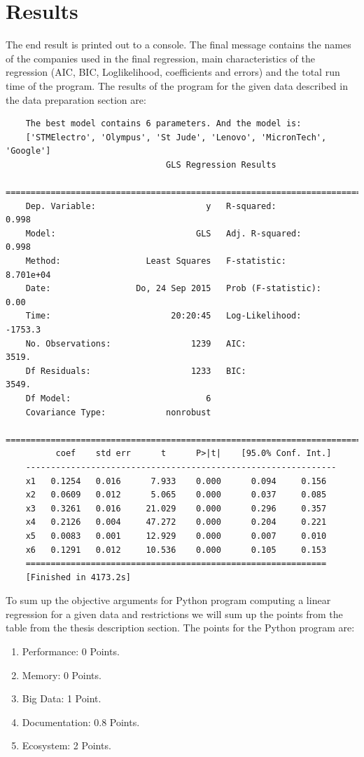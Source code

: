 \documentclass[
  twoside,
  11pt, a4paper,
  footinclude=true,
  headinclude=true,
  cleardoublepage=empty
]{scrreprt}
\begin{document}
    \section{Results}
    The end result is printed out to a console. The final message contains the names of the companies used in the final regression, main characteristics of the regression (AIC, BIC, Loglikelihood, coefficients and errors) and the total run time of the program. 
    The results of the program for the given data described in the data preparation section are:
    \begin{verbatim}
    The best model contains 6 parameters. And the model is:
    ['STMElectro', 'Olympus', 'St Jude', 'Lenovo', 'MicronTech', 'Google']
                                GLS Regression Results                            
    ==========================================================================
    Dep. Variable:                      y   R-squared:               0.998
    Model:                            GLS   Adj. R-squared:          0.998
    Method:                 Least Squares   F-statistic:             8.701e+04
    Date:                 Do, 24 Sep 2015   Prob (F-statistic):      0.00
    Time:                        20:20:45   Log-Likelihood:          -1753.3
    No. Observations:                1239   AIC:                     3519.
    Df Residuals:                    1233   BIC:                     3549.
    Df Model:                           6                                         
    Covariance Type:            nonrobust                                         
    ==========================================================================
          coef    std err      t      P>|t|    [95.0% Conf. Int.]
    --------------------------------------------------------------
    x1   0.1254   0.016      7.933    0.000      0.094     0.156
    x2   0.0609   0.012      5.065    0.000      0.037     0.085
    x3   0.3261   0.016     21.029    0.000      0.296     0.357
    x4   0.2126   0.004     47.272    0.000      0.204     0.221
    x5   0.0083   0.001     12.929    0.000      0.007     0.010
    x6   0.1291   0.012     10.536    0.000      0.105     0.153
    ============================================================
    [Finished in 4173.2s]
    \end{verbatim}
    To sum up the objective arguments for Python program computing a linear regression for a given data and restrictions we will sum up the points from the table from the thesis description section.
    The points for the Python program are:
    \begin{enumerate}
        \item Performance: 0 Points.
        \item Memory: 0 Points.
        \item Big Data: 1 Point.
        \item Documentation: 0.8 Points.
        \item Ecosystem: 2 Points.
    \end{enumerate} 
\end{document}
